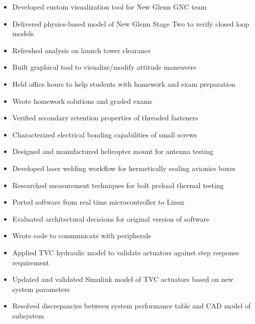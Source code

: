 \documentclass{resume}
\begin{document}
\begin{itemize}
    \item Developed custom visualization tool for New Glenn GNC team
    \item Delivered physics-based model of New Glenn Stage Two to verify closed loop models
    \item Refreshed analysis on launch tower clearance
    \item Built graphical tool to visualize/modify attitude maneuvers
\end{itemize}
\begin{itemize}
    \item Held office hours to help students with homework and exam preparation
    \item Wrote homework solutions and graded exams
\end{itemize}
\begin{itemize}
    \item Verified secondary retention properties of threaded fasteners
    \item Characterized electrical bonding capabilities of small screws
    \item Designed and manufactured helicopter mount for antenna testing
    \item Developed laser welding workflow for hermetically sealing avionics boxes
    \item Researched measurement techniques for bolt preload thermal testing
\end{itemize}
\begin{itemize}
    \item Ported software from real time microcontroller to Linux
    \item Evaluated architectural decisions for original version of software
    \item Wrote code to communicate with peripherals
\end{itemize}
\begin{itemize}
    \item Applied TVC hydraulic model to validate actuators against step response requirement
    \item Updated and validated Simulink model of TVC actuators based on new system parameters
    \item Resolved discrepancies between system performance table and CAD model of subsystem
\end{itemize}
\end{document}
